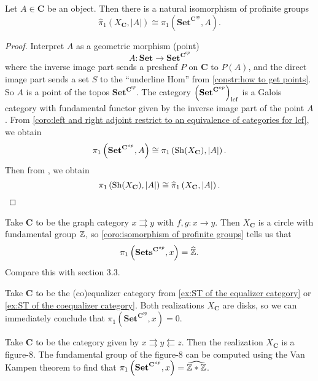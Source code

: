 \begin{corollary*}
\label{coro:isomorphism of profinite groups}
Let $A \in \mathbf{C}$ be an object. Then there is a natural isomorphism of profinite groups
\[ \widehat{\pi}_1\left(X_\mathbf{C}, |A|\right) \cong \pi_1 \left( \mathbf{Set}^{\mathbf{C}^{op}}, A \right). \]
\end{corollary*}
\begin{proof}
Interpret $A$ as a geometric morphism (point)
\[ A : \mathbf{Set} \to \mathbf{Set}^{\mathbf{C}^{op}} \]
where the inverse image part sends a presheaf $P$ on $\mathbf{C}$ to $P(A)$, and the direct image part sends a set $S$ to the ``underline Hom'' from \cref{constr:how to get points}. So $A$ is a point of the topos $\mathbf{Set}^{\mathbf{C}^{op}}$.
The category $\left(\mathbf{Set}^{\mathbf{C}^{op}}\right)_{\operatorname{lcf}}$ is a Galois category with fundamental functor given by the inverse image part of the point $A$. From \cref{coro:left and right adjoint restrict to an equivalence of categories for lcf}, we obtain
\[ \pi_1 \left( \mathbf{Set}^{\mathbf{C}^{op}}, A \right) \cong \pi_1 \left( \operatorname{Sh}(X_\mathbf{C}), |A| \right). \]
Then from \cite[Theorem 1.15, or 3.10]{lenstra08}, we obtain
\[ \pi_1 \left( \operatorname{Sh}(X_\mathbf{C}), |A| \right) \cong \widehat{\pi}_1\left(X_\mathbf{C}, |A|\right). \]
\end{proof}

\begin{example*}
Take $\mathbf{C}$ to be the graph category $x \rightrightarrows y$ with $f,g : x \to y$. Then $X_{\mathbf{C}}$ is a circle with fundamental group $\mathbb{Z}$, so \cref{coro:isomorphism of profinite groups} tells us that
\[ \pi_1 \left( \mathbf{Sets}^{\mathbf{C}^{op}}, x\right) = \widehat{\mathbb{Z}}. \] Compare this with section 3.3.
\end{example*}

\begin{example*}
Take $\mathbf{C}$ to be the (co)equalizer category from \cref{ex:ST of the equalizer category} or \cref{ex:ST of the coequalizer category}. Both realizations $X_{\mathbf{C}}$ are disks, so we can immediately conclude that $\pi_1 \left( \mathbf{Set}^{\mathbf{C}^{op}}, x \right) = 0$.
\end{example*}

\begin{example*}
Take $\mathbf{C}$ to be the category given by $x \rightrightarrows y \leftleftarrows z$. Then the realization $X_{\mathbf{C}}$ is a figure-8. The fundamental group of the figure-8 can be computed using the Van Kampen theorem to find that $\pi_1\left(\mathbf{Set}^{\mathbf{C}^{op}}, x\right) = \widehat{\mathbb{Z} * \mathbb{Z}}$.
\end{example*}

